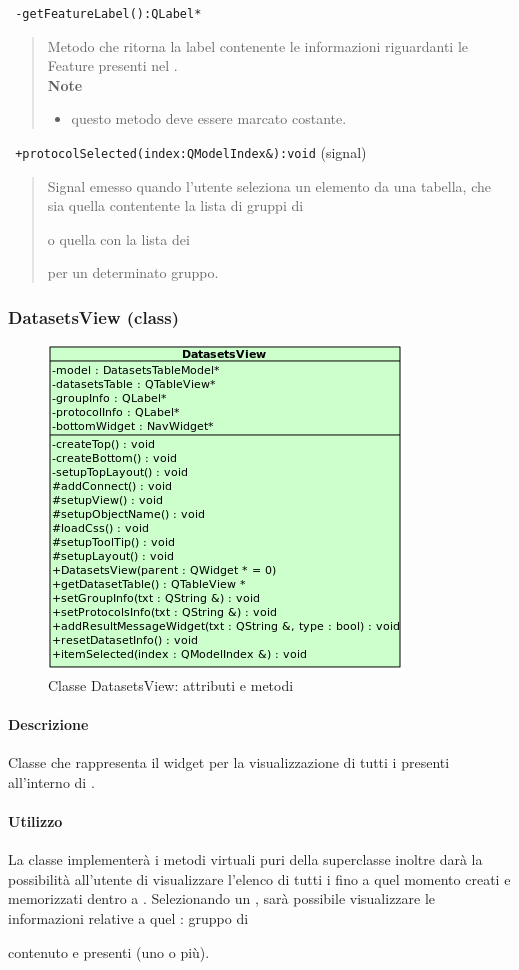 \color{blue}\verb! -getFeatureLabel():QLabel*!
\begin{quote}
\color{black}Metodo che ritorna la label contenente le informazioni riguardanti le Feature\g{} presenti nel \protocol{}.\\
 \textbf{Note}
 \begin{itemize}
 \item questo metodo deve essere marcato costante.
 \end{itemize}
\end{quote}
\color{blue}\verb! +protocolSelected(index:QModelIndex&):void! (signal)
\color{black} 
\begin{quote}
Signal\g{} emesso quando l'utente seleziona un elemento da una tabella, che sia quella contentente la lista di gruppi di \subject{} o quella con la lista dei \subject{} per un determinato gruppo.
\end{quote}
\subsubsection{DatasetsView (class)}
\label{spedatV}
\begin{figure}[!h]
\centering
			\includegraphics[width=0.5\linewidth]{./Content/Immagini/view/DatasetsView.png}
			\caption{Classe DatasetsView: attributi e metodi}
			\label{cl_datview}
\end{figure}
\paragraph{Descrizione \\}
Classe che rappresenta il widget per la visualizzazione di tutti i \dataset{} presenti all'interno di \project.
\paragraph{Utilizzo\\}
La classe implementerà i metodi virtuali puri della superclasse inoltre darà la possibilità all'utente di visualizzare l'elenco di tutti i \dataset{} fino a quel momento creati e memorizzati dentro a \project. Selezionando un \dataset{}, sarà possibile visualizzare le informazioni relative a quel \dataset{}: gruppo di \subject{} contenuto e \protocol{} presenti (uno o più).
